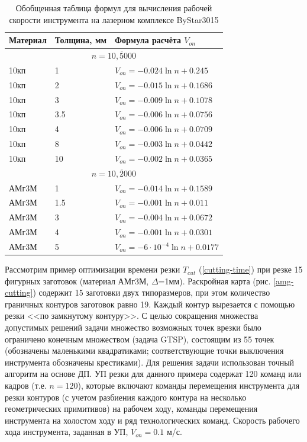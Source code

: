 \documentclass[11pt,twoside]{report}
\begin{document}
\begin{table}
  \caption{Обобщенная таблица формул для вычисления рабочей скорости инструмента на лазерном комплексе ByStar3015}
  \label{v-formulae}
  \begin{tabular}{lll}
    \hline
    Материал & Толщина, мм & Формула расчёта $V_{on}$ \\
    \hline
    \multicolumn{3}{c}{$n=\overline{10,5000}$} \\
    10кп & 1 & $V_{on} = -0.024 \ln n+0.245$ \\
    10кп & 2 & $V_{on} = -0.015 \ln n+0.1686$ \\
    10кп & 3 & $V_{on} = -0.009 \ln n+0.1078$ \\
    10кп & 3.5 & $V_{on} = -0.006 \ln n+0.0756$ \\
    10кп & 4 & $V_{on} = -0.006 \ln n+0.0709$ \\
    10кп & 8 & $V_{on} = -0.003 \ln n+0.0442$ \\
    10кп & 10 & $V_{on} = -0.002 \ln n+0.0365$ \\
    \multicolumn{3}{c}{$n=\overline{10,2000}$} \\
    АМг3М & 1 & $V_{on} = -0.014 \ln n+0.1589$ \\
    АМг3М & 1.5 & $V_{on} = -0.001 \ln n+0.011$ \\
    АМг3М & 3 & $V_{on} = -0.004 \ln n+0.0672$ \\
    АМг3М & 4 & $V_{on} = -0.001 \ln n+0.0301$ \\
    АМг3М & 5 & $V_{on} = -6\cdot 10^{-4} \ln n+0.0177$ \\
  \end{tabular}
\end{table}

Рассмотрим пример оптимизации времени резки
$T_{cut}$
(\ref{cutting-time})
при резке 15 фигурных заготовок
(материал АМг3М, $\Delta$=1мм).
Раскройная карта (рис. \ref{amg-cutting})
содержит 15 заготовки двух типоразмеров,
при этом количество граничных контуров заготовок равно 19.
Каждый контур вырезается с помощью резки
<<по замкнутому контуру>>.
С целью сокращения множества допустимых решений
задачи множество возможных точек врезки было
ограничено конечным множеством (задача GTSP),
состоящим из 55 точек
(обозначены маленькими квадратиками;
соответствующие точки выключения инструмента обозначены крестиками).
Для решения задачи использован точный алгоритм на основе ДП.
УП резки для данного примера содержат 120 команд или кадров
(т.е. $n=120$),
которые включают команды перемещения инструмента
для резки контуров
(с учетом разбиения каждого контура на несколько геометрических примитивов)
на рабочем ходу,
команды перемещения инструмента на холостом ходу
и ряд технологических команд.
Скорость рабочего хода инструмента, заданная в УП,
$V_{on}=0.1$ м/с.
\end{document}
